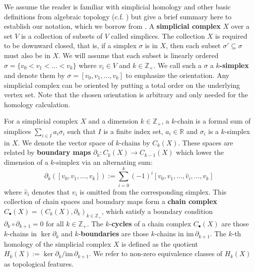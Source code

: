 \documentclass[pdflatex,bst/sn-mathphys-num]{sn-jnl}%
\theoremstyle{thmstyleone}%
\theoremstyle{definition}
\theoremstyle{thmstyletwo}%
\theoremstyle{thmstylethree}%
\begin{document}
We assume the reader is familiar with simplicial homology and other basic definitions from algebraic topology (c.f. \cite{Hatcher_AT}) but give a brief summary here to establish our notation, which we borrow from \cite{chowdhury2018AsymNets}.
A \textbf{simplicial complex} $X$ over a set $V$ is a collection of subsets of $V$ called simplices. The collection $X$ is required to be downward closed, that is, if a simplex $\sigma$ is in $X$, then each subset $\sigma'\subseteq \sigma$ must also be in $X$. We will assume that each subset is linearly ordered $\sigma = \{v_0 < v_1 < \dots < v_k\}$ where $v_i \in V$ and $k \in \mathbb{Z}_+$. We call such a $\sigma$ a $k$\textbf{-simplex} and denote them by $\sigma = [v_0, v_1, \dots, v_k]$ to emphasize the orientation. Any simplicial complex can be oriented by putting a total order on the underlying vertex set. Note that the chosen orientation is arbitrary and only needed for the homology calculation.


For a simplicial complex $X$ and a dimension $k \in \mathbb{Z}_+$, a $k$-chain is a formal sum of simplices $\sum_{i \in I} a_i \sigma_i$ such that $I$ is a finite index set, $a_i \in \mathbb{R}$ and $\sigma_i$ is a $k$-simplex in $X$. We denote the vector space of $k$-chains by $C_k(X)$. These spaces are related by \textbf{boundary maps} $\partial_k : C_{k}(X) \to C_{k-1}(X)$ which lower the dimension of a $k$-simplex via an alternating sum:
\[ \partial_k ([v_0, v_1, \dots, v_k]) := \sum_{i = 0}^k (-1)^i[v_0, v_1, \dots , \hat{v}_i, \dots, v_k]\]
where $\hat{v}_i$ denotes that $v_i$ is omitted from the corresponding simplex. This collection of chain spaces and boundary maps form a \textbf{chain complex} $C_\bullet(X) = (C_k(X), \partial_k)_{k \in \mathbb{Z}_+}$, which satisfy a boundary condition $\partial_{k} \circ \partial_{k+1} = 0$ for all $k \in \mathbb{Z}_+$. The $k$-\textbf{cycles} of a chain complex $C_\bullet(X)$ are those $k$-chains in $\ker\partial_k$ and $k$-\textbf{boundaries} are those $k$-chains in $\text{im} \, \partial_{k+1}$. The $k$-th homology of the simplicial complex $X$ is defined as the quotient $H_k(X) := \ker\partial_k / \text{im} \, \partial_{k+1}$. We refer to non-zero equivalence classes of $H_k(X)$ as topological features. 
\end{document}
